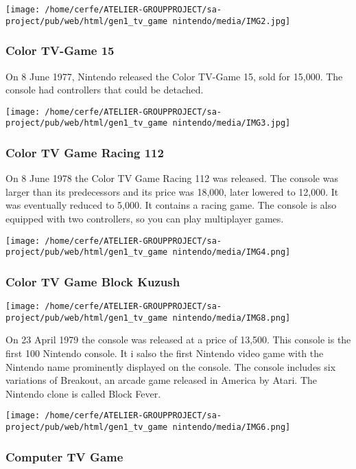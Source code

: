 \documentclass[a4paper,10pt]{book}
\begin{document}
 \texttt{[image: /home/cerfe/ATELIER-GROUPPROJECT/sa-project/pub/web/html/gen1\_tv\_game nintendo/media/IMG2.jpg]}
 
 
 \subsubsection{Color TV-Game 15 }
 
  On 8 June 1977, Nintendo released the Color TV-Game 15, sold for 15,000. The console had controllers that could be detached.
 
 \texttt{[image: /home/cerfe/ATELIER-GROUPPROJECT/sa-project/pub/web/html/gen1\_tv\_game nintendo/media/IMG3.jpg]}
 
 
 \subsubsection{Color TV Game Racing 112 }
 
  On 8 June 1978 the Color TV Game Racing 112 was released. The console was larger than its predecessors and its price was 18,000, later lowered to 12,000. It was eventually reduced to 5,000. It contains a racing game. The console is also equipped with two controllers, so you can play multiplayer games.
 
 \texttt{[image: /home/cerfe/ATELIER-GROUPPROJECT/sa-project/pub/web/html/gen1\_tv\_game nintendo/media/IMG4.png]}
 
 
 \subsubsection{Color TV Game Block Kuzush }
 
 
 \texttt{[image: /home/cerfe/ATELIER-GROUPPROJECT/sa-project/pub/web/html/gen1\_tv\_game nintendo/media/IMG8.png]}
 
 On 23 April 1979 the console was released at a price of  13,500. This console is the first 100 Nintendo console. It i salso the first Nintendo video game with the Nintendo name prominently displayed on the console. The console includes six variations of Breakout, an arcade game released in America by Atari. The Nintendo clone is called Block Fever.
 
 
 \texttt{[image: /home/cerfe/ATELIER-GROUPPROJECT/sa-project/pub/web/html/gen1\_tv\_game nintendo/media/IMG6.png]}
 
 
 \subsubsection{Computer TV Game }
 
\end{document}
